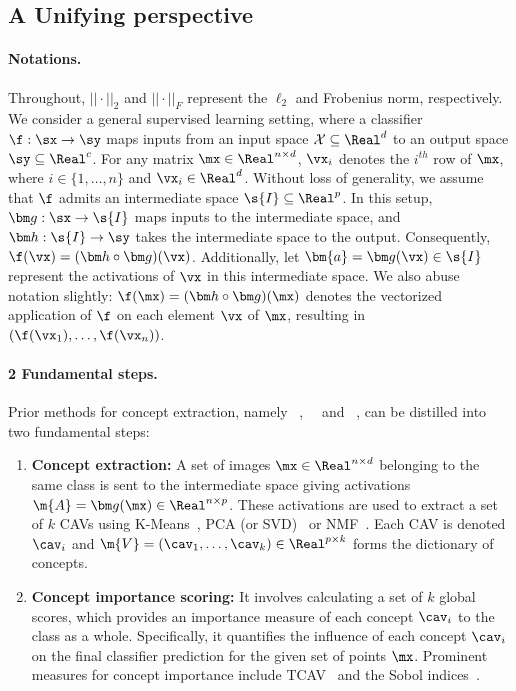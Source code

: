 \subsection{A Unifying perspective}

\paragraph{Notations.} Throughout, $||\cdot||_2$ and $||\cdot||_F$ represent the $\ell_2$ and Frobenius norm, respectively. 
We consider a general supervised learning setting, where a classifier $\f : \sx \to \sy$ maps inputs from an input space $\mathcal{X} \subseteq \Real^d$ to an output space $\sy \subseteq \Real^c$. 
For any matrix $\mx \in \Real^{n \times d}$, $\vx_i$ denotes the $i^{th}$ row of $\mx$, where $i \in \{1, \ldots, n \}$ and $\vx_i \in \Real^{d}$.
Without loss of generality, we assume that $\f$ admits an intermediate space $\s{I} \subseteq \Real^p$. In this setup, $\fa : \sx \to \s{I}$ maps inputs to the intermediate space, and $\fb : \s{I} \to \sy$ takes the intermediate space to the output. Consequently, $\f(\vx) = (\fb \circ \fa)(\vx)$. Additionally, let $\bm{a} = \fa(\vx) \in \s{I}$ represent the activations of $\vx$ in this intermediate space.
We also abuse notation slightly: $\f(\mx) = (\fb \circ \fa)(\mx)$ denotes the vectorized application of $\f$ on each element $\vx$ of $\mx$, resulting in $(\f(\vx_1),\ldots, \f(\vx_n))$.

\paragraph{2 Fundamental steps.} Prior methods for concept extraction, namely \ACE~\cite{ghorbani2019towards}, \ICE~\cite{zhang2021invertible}~and \CRAFT~\cite{fel2023craft}, can be distilled into two fundamental steps:

\begin{enumerate}[label=(\textit{\textbf{\roman*}}), labelindent=0pt,leftmargin=5mm]

\item {\bf Concept extraction:} A set of images $\mx \in \Real^{n\times d}$ belonging to the same class is sent to the intermediate space giving activations $\m{A} = \fa(\mx) \in \Real^{n \times p}$.
These activations are used to extract a set of $k$ CAVs using K-Means~\cite{ghorbani2019towards}, PCA (or SVD)~\cite{zhang2021invertible, graziani2023concept} or NMF~\cite{zhang2021invertible, fel2023craft}. Each CAV is denoted $\cav_i$ and $\m{V} = (\cav_1, \ldots, \cav_k) \in \Real^{p \times k}$ forms the dictionary of concepts.

\item {\bf Concept importance scoring:} 
It involves calculating a set of $k$ global scores, which provides an importance measure of each concept $\cav_i$ to the class as a whole. Specifically, it quantifies the influence of each concept $\cav_i$ on the final classifier prediction for the given set of points  $\mx$. Prominent measures for concept importance include TCAV~\cite{kim2018interpretability} and the Sobol indices~\cite{fel2023craft}. 

\end{enumerate}


